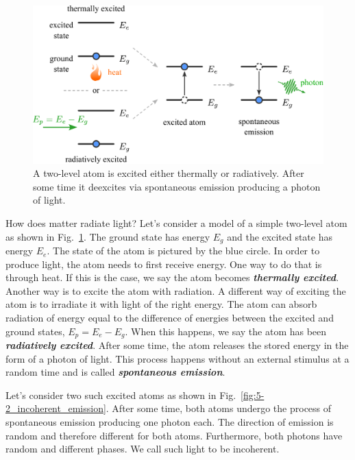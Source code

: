 \begin{figure}
    \centering
    \includegraphics[width=\textwidth]{lesson5/5-2_spontaneous_emission.pdf}
    \caption[Spontaneous emission]{A two-level atom is excited either thermally or radiatively. After some time it deexcites via spontaneous emission producing a photon of light.}
    \label{fig:5-2_spontaneous_emission}
\end{figure}

How does matter radiate light?
Let's consider a model of a simple two-level atom as shown in Fig.~\ref{fig:5-2_spontaneous_emission}.
The ground state has energy $E_g$ and the excited state has energy $E_e$.
The state of the atom is pictured by the blue circle.
In order to produce light, the atom needs to first receive energy.
One way to do that is through heat.
If this is the case, we say the atom becomes \textit{\textbf{thermally excited}}.
Another way is to excite the atom with radiation.
A different way of exciting the atom is to irradiate it with light of the right energy.
The atom can absorb radiation of energy equal to the difference of energies between the excited and ground states, $E_p = E_e - E_g$.
When this happens, we say the atom has been \textit{\textbf{radiatively excited}}.
After some time, the atom releases the stored energy in the form of a photon of light.
This process happens without an external stimulus at a random time and is called \textit{\textbf{spontaneous emission}}.

Let's consider two such excited atoms as shown in Fig.~\ref{fig:5-2_incoherent_emission}.
After some time, both atoms undergo the process of spontaneous emission producing one photon each.
The direction of emission is random and therefore different for both atoms.
Furthermore, both photons have random and different phases.
We call such light to be incoherent.

